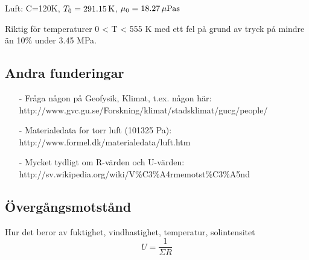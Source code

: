 Luft: C=120K, $T_0=\unit[291.15]{K}$, $\mu_0=\unit[18.27]{\mu Pa s}$

Riktig för temperaturer 0 < T < 555 K med ett fel på grund av tryck på mindre än 10\% under 3.45 MPa.



\subsection{Andra funderingar}
\begin{itemize}
\item[-] Fråga någon på Geofysik, Klimat, t.ex. någon här: \\
http://www.gvc.gu.se/Forskning/klimat/stadsklimat/gucg/people/
\item[-] Materialedata for torr luft (101325 Pa): http://www.formel.dk/materialedata/luft.htm
\item[-] Mycket tydligt om R-värden och U-värden: \\
http://sv.wikipedia.org/wiki/V\%C3\%A4rmemotst\%C3\%A5nd
\end{itemize}



\subsection{Övergångsmotstånd}
Hur det beror av fuktighet, vindhastighet, temperatur, solintensitet
\begin{equation}
U=\frac{1}{\Sigma R}
\end{equation}

